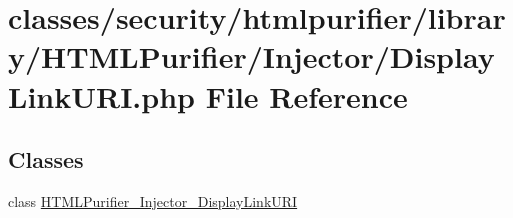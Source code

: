 \hypertarget{DisplayLinkURI_8php}{\section{classes/security/htmlpurifier/library/\+H\+T\+M\+L\+Purifier/\+Injector/\+Display\+Link\+U\+R\+I.php File Reference}
\label{DisplayLinkURI_8php}
}
\subsection*{Classes}
\begin{DoxyCompactItemize}
\item 
class \hyperlink{classHTMLPurifier__Injector__DisplayLinkURI}{H\+T\+M\+L\+Purifier\+\_\+\+Injector\+\_\+\+Display\+Link\+U\+R\+I}
\end{DoxyCompactItemize}
